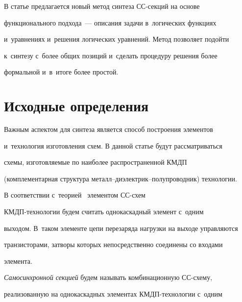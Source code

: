    


   В статье предлагается новый метод синтеза СС-сек\-ций на основе 


функционального подхода~--- описания задачи в~логических функциях 


и~уравнениях и~решения логических уравнений. Метод позволяет подойти 


к~синтезу с~более общих позиций и~сделать процедуру решения более 


формальной и~в~итоге более простой.





\vspace*{3pt}


   


\section{Исходные определения}





\vspace*{3pt}


       


   Важным аспектом для синтеза является способ построения элементов 


и~технология изготовления схем. В данной статье будут рассматриваться 


схемы, изготовляемые по наиболее распространенной КМДП


(комплементарная структура ме\-талл--ди\-элект\-рик--по\-лу\-про\-вод\-ник) тех\-но\-ло\-гии.


   


   В соответствии с~теорией~\cite{7-pl} элементом СС-схем  


КМДП-тех\-но\-ло\-гии будем считать однокаскадный элемент с~одним 


выходом. В~таком элементе цепи перезаряда нагрузки на выходе управляются 


транзисторами, затворы которых непосредственно соединены со входами 


элемента.


   


   \textit{Самосинхронной секцией} будем называть комбинационную СС-схе\-му, 


реализованную на однокаскадных элементах КМДП-тех\-но\-ло\-гии с~одним 


